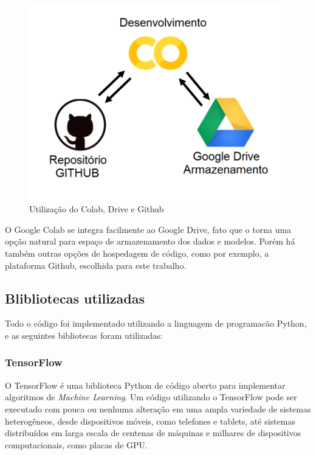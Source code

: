 \begin{figure}[H]
		\centering
		\includegraphics[scale=0.4]{figuras/MachineLearning/colabGithub.png}
		\caption{Utilização do Colab, Drive e Github}
		\label{fig:colabGithub}
\end{figure}

O Google Colab se integra facilmente ao Google Drive, fato que o torna uma opção natural para espaço de armazenamento dos dados e modelos. Porém há também outras opções de hospedagem de código, como por exemplo, a plataforma Github, escolhida para este trabalho.

\subsection{Blibliotecas utilizadas}

Todo o código foi implementado utilizando a linguagem de programacão Python, e as seguintes bibliotecas foram utilizadas:


\subsubsection{TensorFlow}

O TensorFlow é uma biblioteca Python de código aberto para implementar algoritmos de \textit{Machine Learning}. Um código utilizando o TensorFlow pode ser executado com pouca ou nenhuma alteração em uma ampla variedade de sistemas heterogêneos, desde dispositivos móveis, como telefones e tablets, até sistemas distribuídos em larga escala de centenas de máquinas e milhares de dispositivos computacionais, como placas de GPU.

